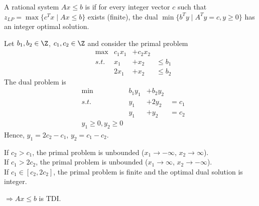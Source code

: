 \begin{defn}\label{def23.4}
A rational system $A x \leq b$ is  if for every integer vector $c$ such that $z_{LP} = \max \{ c^Tx \mid Ax
\leq b\}$ exists (finite), the dual $\min \{ b^Ty \mid A^Ty=c, y \geq 0\}$
has an integer optimal solution.
\end{defn}

\begin{xmp+}
Let $b_1, b_2 \in \Z$, $c_1, c_2 \in \Z$ and consider the primal problem
\begin{align*}
&\max & c_1 x_1 &+ c_2 x_2 \\
&s.t. & x_1 &+ x_2 & \leq b_1 \\
&& 2 x_1 &+ x_2 &\leq b_2
\end{align*}
The dual problem is
\begin{align*}
&\min & b_1 y_1 &+ b_2 y_2 \\
&s.t. & y_1 &+ 2y_2 & = c_1 \\
&& y_1 &+ y_2 & = c_2 \\
& y_1 \geq 0, y_2 \geq 0
\end{align*}
Hence, $y_1 = 2 c_2 - c_1$, $y_2 = c_1 - c_2$.

If $c_2 > c_1$, the primal problem is unbounded ($x_1 \rightarrow -\infty$,
$x_2 \rightarrow \infty$). \\
If $c_1 > 2 c_2$, the primal problem is unbounded ($x_1 \rightarrow \infty$,
$x_2 \rightarrow -\infty$). \\
If $c_1 \in [c_2, 2 c_2]$, the primal problem is finite and the optimal dual
solution is integer. 

$\Rightarrow A x \leq b$ is TDI.
\end{xmp+}

